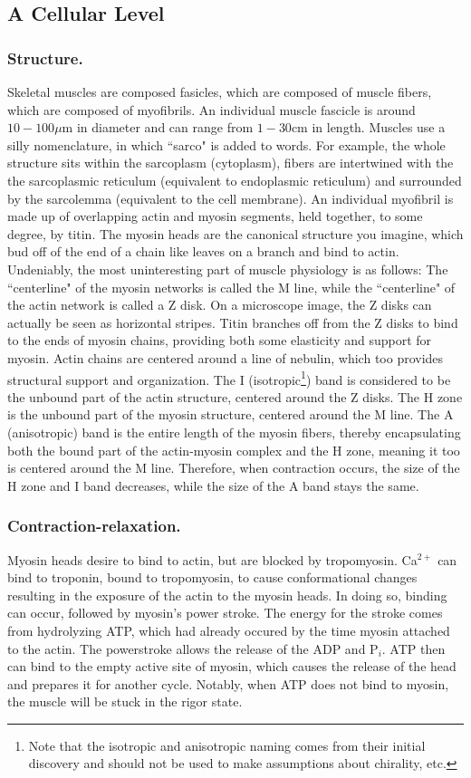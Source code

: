 \subsection{A Cellular Level}
\subsubsection{Structure.}
Skeletal muscles are composed fasicles, which are composed of muscle fibers, which are composed of myofibrils. An individual muscle fascicle is around $10-100\mu$m in diameter and can range from $1-30$cm in length. Muscles use a silly nomenclature, in which ``sarco" is added to words. For example, the whole structure sits within the sarcoplasm (cytoplasm), fibers are intertwined with the the sarcoplasmic reticulum (equivalent to endoplasmic reticulum) and surrounded by the sarcolemma (equivalent to the cell membrane). An individual myofibril is made up of overlapping actin and myosin segments, held together, to some degree, by titin. The myosin heads are the canonical structure you imagine, which bud off of the end of a chain like leaves on a branch and bind to actin. Undeniably, the most uninteresting part of muscle physiology is as follows: The ``centerline" of the myosin networks is called the M line, while the ``centerline" of the actin network is called a Z disk. On a microscope image, the Z disks can actually be seen as horizontal stripes. Titin branches off from the Z disks to bind to the ends of myosin chains, providing both some elasticity and support for myosin. Actin chains are centered around a line of nebulin, which too provides structural support and organization. The I (isotropic\footnote{Note that the isotropic and anisotropic naming comes from their initial discovery and should not be used to make assumptions about chirality, etc.}) band is considered to be the unbound part of the actin structure, centered around the Z disks. The H zone is the unbound part of the myosin structure, centered around the M line. The A (anisotropic) band is the entire length of the myosin fibers, thereby encapsulating both the bound part of the actin-myosin complex and the H zone, meaning it too is centered around the M line. Therefore, when contraction occurs, the size of the H zone and I band decreases, while the size of the A band stays the same.

\subsubsection{Contraction-relaxation.}
Myosin heads desire to bind to actin, but are blocked by tropomyosin. Ca$^{2+}$ can bind to troponin, bound to tropomyosin, to cause conformational changes resulting in the exposure of the actin to the myosin heads. In doing so, binding can occur, followed by myosin's power stroke. The energy for the stroke comes from hydrolyzing ATP, which had already occured by the time myosin attached to the actin. The powerstroke allows the release of the ADP and P$_i$. ATP then can bind to the empty active site of myosin, which causes the release of the head and prepares it for another cycle. Notably, when ATP does not bind to myosin, the muscle will be stuck in the rigor state.\newline

